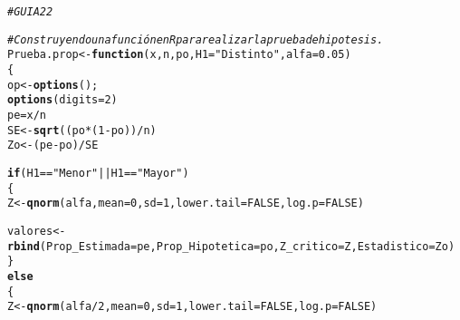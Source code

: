 \documentclass{article}\usepackage[]{graphicx}\usepackage[]{color}
\makeatletter
\newcommand{\hlnum}[1]{\textcolor[rgb]{0.686,0.059,0.569}{#1}}%
\newcommand{\hlstr}[1]{\textcolor[rgb]{0.192,0.494,0.8}{#1}}%
\newcommand{\hlcom}[1]{\textcolor[rgb]{0.678,0.584,0.686}{\textit{#1}}}%
\newcommand{\hlopt}[1]{\textcolor[rgb]{0,0,0}{#1}}%
\newcommand{\hlstd}[1]{\textcolor[rgb]{0.345,0.345,0.345}{#1}}%
\newcommand{\hlkwa}[1]{\textcolor[rgb]{0.161,0.373,0.58}{\textbf{#1}}}%
\newcommand{\hlkwb}[1]{\textcolor[rgb]{0.69,0.353,0.396}{#1}}%
\newcommand{\hlkwc}[1]{\textcolor[rgb]{0.333,0.667,0.333}{#1}}%
\newcommand{\hlkwd}[1]{\textcolor[rgb]{0.737,0.353,0.396}{\textbf{#1}}}%
\newenvironment{kframe}{%
 \def\at@end@of@kframe{}%
 \ifinner\ifhmode%
  \def\at@end@of@kframe{\end{minipage}}%
  \begin{minipage}{\columnwidth}%
 \fi\fi%
 \def\FrameCommand##1{\hskip\@totalleftmargin \hskip-\fboxsep
 \colorbox{shadecolor}{##1}\hskip-\fboxsep
     \hskip-\linewidth \hskip-\@totalleftmargin \hskip\columnwidth}%
 \MakeFramed {\advance\hsize-\width
   \@totalleftmargin\z@ \linewidth\hsize
   \@setminipage}}%
 {\par\unskip\endMakeFramed%
 \at@end@of@kframe}
\newenvironment{knitrout}{}{} %
\makeatother
\begin{document}
\begin{knitrout}
\color{fgcolor}\begin{kframe}
\begin{alltt}
\hlcom{# GUIA 22}

\hlcom{#Construyendo una función en R para realizar la prueba de hipotesis.}
\hlstd{Prueba.prop} \hlkwb{<-} \hlkwa{function}\hlstd{(}\hlkwc{x}\hlstd{,} \hlkwc{n}\hlstd{,} \hlkwc{po}\hlstd{,} \hlkwc{H1}\hlstd{=}\hlstr{"Distinto"}\hlstd{,} \hlkwc{alfa}\hlstd{=}\hlnum{0.05}\hlstd{)}
\hlstd{\{}
  \hlstd{op} \hlkwb{<-} \hlkwd{options}\hlstd{();}
  \hlkwd{options}\hlstd{(}\hlkwc{digits}\hlstd{=}\hlnum{2}\hlstd{)}
  \hlstd{pe}\hlkwb{=}\hlstd{x}\hlopt{/}\hlstd{n}
  \hlstd{SE} \hlkwb{<-} \hlkwd{sqrt}\hlstd{((po} \hlopt{*} \hlstd{(}\hlnum{1}\hlopt{-}\hlstd{po))}\hlopt{/}\hlstd{n)}
  \hlstd{Zo} \hlkwb{<-} \hlstd{(pe}\hlopt{-}\hlstd{po)}\hlopt{/}\hlstd{SE}

  \hlkwa{if} \hlstd{(H1} \hlopt{==} \hlstr{"Menor"} \hlopt{||} \hlstd{H1} \hlopt{==} \hlstr{"Mayor"}\hlstd{)}
  \hlstd{\{}
    \hlstd{Z} \hlkwb{<-} \hlkwd{qnorm}\hlstd{(alfa,} \hlkwc{mean}\hlstd{=}\hlnum{0}\hlstd{,} \hlkwc{sd}\hlstd{=}\hlnum{1}\hlstd{,} \hlkwc{lower.tail} \hlstd{=} \hlnum{FALSE}\hlstd{,} \hlkwc{log.p} \hlstd{=} \hlnum{FALSE}\hlstd{)}

    \hlstd{valores} \hlkwb{<-} \hlkwd{rbind}\hlstd{(}\hlkwc{Prop_Estimada}\hlstd{=pe,} \hlkwc{Prop_Hipotetica}\hlstd{=po,} \hlkwc{Z_critico}\hlstd{=Z,}\hlkwc{Estadistico}\hlstd{= Zo)}
  \hlstd{\}}
  \hlkwa{else}
  \hlstd{\{}
    \hlstd{Z} \hlkwb{<-} \hlkwd{qnorm}\hlstd{(alfa}\hlopt{/}\hlnum{2}\hlstd{,} \hlkwc{mean}\hlstd{=}\hlnum{0}\hlstd{,} \hlkwc{sd}\hlstd{=}\hlnum{1}\hlstd{,} \hlkwc{lower.tail} \hlstd{=} \hlnum{FALSE}\hlstd{,} \hlkwc{log.p} \hlstd{=} \hlnum{FALSE}\hlstd{)}


\end{alltt}
\end{kframe}
\end{knitrout}
\end{document}
